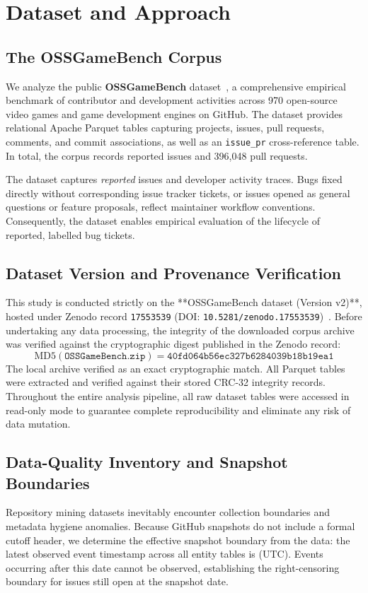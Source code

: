\section{Dataset and Approach}\label{sec:data}

\subsection{The OSSGameBench Corpus}\label{sec:corpus}
We analyze the public \textbf{OSSGameBench} dataset~\cite{marsad2026ossgamebench}, a comprehensive empirical benchmark of contributor and development activities across 970 open-source video games and game development engines on GitHub. The dataset provides relational Apache Parquet tables capturing projects, issues, pull requests, comments, and commit associations, as well as an \texttt{issue\_pr} cross-reference table. In total, the corpus records \valSzero{} reported issues and 396,048 pull requests.

The dataset captures \emph{reported} issues and developer activity traces. Bugs fixed directly without corresponding issue tracker tickets, or issues opened as general questions or feature proposals, reflect maintainer workflow conventions. Consequently, the dataset enables empirical evaluation of the lifecycle of reported, labelled bug tickets.

\subsection{Dataset Version and Provenance Verification}\label{sec:provenance}
This study is conducted strictly on the **OSSGameBench dataset (Version v2)**, hosted under Zenodo record \texttt{17553539} (DOI: \texttt{10.5281/zenodo.17553539})~\cite{zenodo_ossgamebench_v2}. Before undertaking any data processing, the integrity of the downloaded corpus archive was verified against the cryptographic digest published in the Zenodo record:
\begin{equation}
\text{MD5}(\texttt{OSSGameBench.zip}) = \texttt{40fd064b56ec327b6284039b18b19ea1}
\end{equation}
The local archive verified as an exact cryptographic match. All Parquet tables were extracted and verified against their stored CRC-32 integrity records. Throughout the entire analysis pipeline, all raw dataset tables were accessed in read-only mode to guarantee complete reproducibility and eliminate any risk of data mutation.

\subsection{Data-Quality Inventory and Snapshot Boundaries}\label{sec:inventory}
Repository mining datasets inevitably encounter collection boundaries and metadata hygiene anomalies. Because GitHub snapshots do not include a formal cutoff header, we determine the effective snapshot boundary from the data: the latest observed event timestamp across all entity tables is \valsnapshot{} (UTC). Events occurring after this date cannot be observed, establishing the right-censoring boundary for issues still open at the snapshot date.

